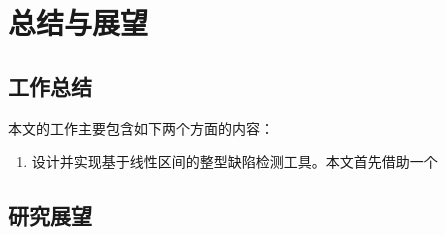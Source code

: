 
\chapter{总结与展望}

\section{工作总结}

本文的工作主要包含如下两个方面的内容：

\begin{enumerate}[1）]
	\item 设计并实现基于线性区间的整型缺陷检测工具。本文首先借助一个
\end{enumerate}





\section{研究展望}


%
%
%
%
%
%
%
%
%
%
